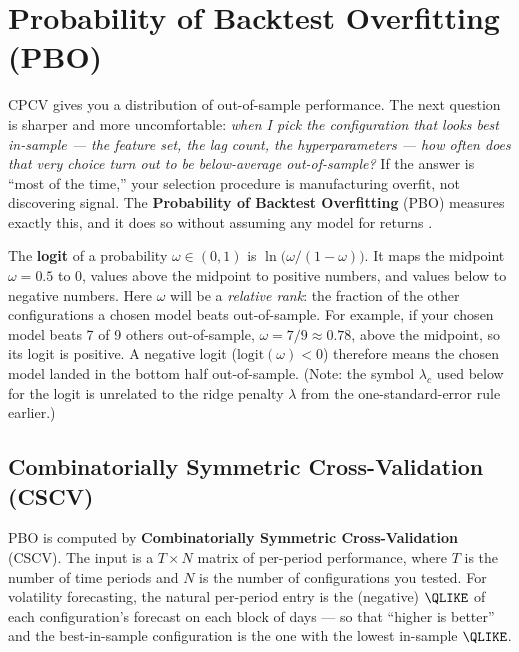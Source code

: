 \section{Probability of Backtest Overfitting (PBO)}
\label{sec:ch16:pbo}

CPCV gives you a distribution of out-of-sample performance.
The next question is sharper and more uncomfortable: \emph{when I pick the configuration that looks best in-sample --- the feature set, the lag count, the hyperparameters --- how often does that very choice turn out to be below-average out-of-sample?}
If the answer is ``most of the time,'' your selection procedure is manufacturing overfit, not discovering signal.
The \textbf{Probability of Backtest Overfitting} (PBO) measures exactly this, and it does so without assuming any model for returns \citep{Bailey2014PBO}.

\begin{prereq}
The \textbf{logit} of a probability $\omega \in (0,1)$ is $\ln\!\bigl(\omega/(1-\omega)\bigr)$.
It maps the midpoint $\omega = 0.5$ to $0$, values above the midpoint to positive numbers, and values below to negative numbers.
Here $\omega$ will be a \emph{relative rank}: the fraction of the other configurations a chosen model beats out-of-sample. For example, if your chosen model beats 7 of 9 others out-of-sample, $\omega = 7/9 \approx 0.78$, above the midpoint, so its logit is positive.
A negative logit ($\text{logit}(\omega) < 0$) therefore means the chosen model landed in the bottom half out-of-sample.
(Note: the symbol $\lambda_c$ used below for the logit is unrelated to the ridge penalty $\lambda$ from the one-standard-error rule earlier.)
\end{prereq}

\subsection{Combinatorially Symmetric Cross-Validation (CSCV)}

PBO is computed by \textbf{Combinatorially Symmetric Cross-Validation} (CSCV).
The input is a $T \times N$ matrix of per-period performance, where $T$ is the number of time periods and $N$ is the number of configurations you tested.
For volatility forecasting, the natural per-period entry is the (negative) $\QLIKE$ of each configuration's forecast on each block of days --- so that ``higher is better'' and the best-in-sample configuration is the one with the lowest in-sample $\QLIKE$.

